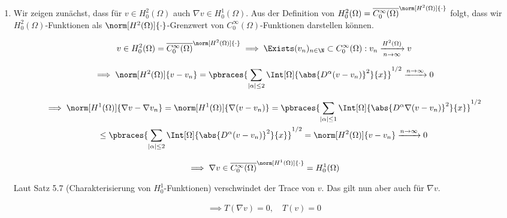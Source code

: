 \begin{solution}

\phantom{}

\begin{enumerate}[label = (\alph*)]

  \item Wir zeigen zunächst, dass für $v \in H_0^2(\Omega)$ auch $\nabla v \in H_0^1(\Omega)$.
  Aus der Definition von $H_0^2(\Omega) = \overline{C_0^{\infty}(\Omega)}^{\norm[H^2(\Omega)]{\cdot}}$ folgt, dass wir $H_0^2(\Omega)$-Funktionen als $\norm[H^2(\Omega)]{\cdot}$-Grenzwert von $C_0^\infty(\Omega)$-Funktionen darstellen können.

  \begin{align*}
    v \in H_0^2(\Omega) = \overline{C_0^{\infty}(\Omega)}^{\norm[H^2(\Omega)]{\cdot}}
    \implies
    \Exists (v_n)_{n \in \N} \subset C_0^{\infty}(\Omega):
    v_n \xrightarrow[n \to \infty]{H^2(\Omega)} v
  \end{align*}

  \begin{align*}
    \implies
    \norm[H^2(\Omega)]{v - v_n}
    =
    \pbraces
    {
      \sum_{|\alpha| \leq 2}
      \Int[\Omega]{\abs{D^\alpha(v - v_n)}^2}{x}
    }^{1/2}
    \xrightarrow{n \to \infty}
    0
  \end{align*}

  \begin{multline*}
    \implies
    \norm[H^1(\Omega)]{\nabla v - \nabla v_n}
    =
    \norm[H^1(\Omega)]{\nabla(v - v_n)}
    =
    \pbraces
    {
      \sum_{|\alpha| \leq 1}
      \Int[\Omega]{\abs{D^\alpha \nabla(v - v_n)}^2}{x}
    }^{1/2} \\
    \leq
    \pbraces
    {
      \sum_{|\alpha| \leq 2}
      \Int[\Omega]{\abs{D^\alpha(v - v_n)}^2}{x}
    }^{1/2}
    =
    \norm[H^2(\Omega)]{v - v_n}
    \xrightarrow{n \to \infty}
    0
  \end{multline*}

  \begin{align*}
    \implies
    \nabla v \in \overline{C_0^{\infty}(\Omega)}^{\norm[H^1(\Omega)]{\cdot}} = H_0^1(\Omega)
  \end{align*}

  Laut Satz 5.7 (Charakterisierung von $H_0^1$-Funktionen) verschwindet der Trace von $v$.
  Das gilt nun aber auch für $\nabla v$.

  \begin{align*}
    \implies
    T(\nabla v) = 0,
    \quad
    T(v) = 0
  \end{align*}


\end{enumerate}
\end{solution}
